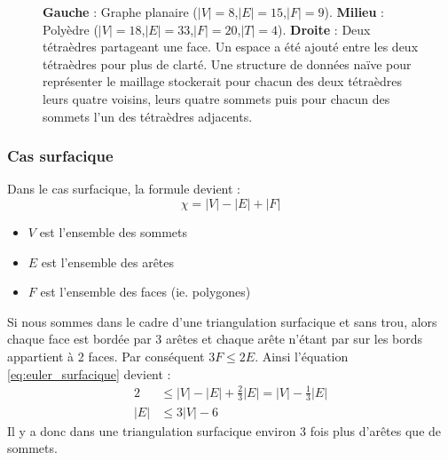 \begin{figure}[th]
\begin{subfigure}{.3\textwidth}
  \caption{}
  \label{fig:naive}
\end{subfigure}
\caption{\textbf{Gauche} : Graphe planaire ($|V|=8$,$|E|=15$,$|F|=9$). \textbf{Milieu} : Polyèdre ($|V|=18$,$|E|=33$,$|F|=20$,$|T|=4$). \textbf{Droite} : Deux tétraèdres partageant une face. Un espace a été ajouté entre les deux tétraèdres pour plus de clarté. Une structure de données naïve pour représenter le maillage stockerait pour chacun des deux tétraèdres leurs quatre voisins, leurs quatre sommets puis pour chacun des sommets l'un des tétraèdres adjacents.}
\label{fig:planar_graph_4cubes}
\end{figure}
\noindent

\subsubsection{Cas surfacique}
\label{combi_2d}
\noindent
Dans le cas surfacique, la formule devient :
\begin{equation}
\label{eq:euler_surfacique}
\chi = |V|-|E|+|F|
\end{equation}
\begin{itemize}
\item $V$ est l'ensemble des sommets
\item $E$ est l'ensemble des arêtes
\item $F$ est l'ensemble des faces (ie. polygones)\\
\end{itemize}
Si nous sommes dans le cadre d'une triangulation surfacique et sans trou, alors chaque face est bordée par 3 arêtes et chaque arête n'étant par sur les bords appartient à 2 faces. Par conséquent $3F\leqslant 2E$. Ainsi l'équation \ref{eq:euler_surfacique} devient :\\
\begin{align*}
2 &\leqslant |V| - |E| + \frac{2}{3}|E| = |V| - \frac{1}{3}|E|\\
|E|&\leqslant 3|V|-6
\end{align*}
Il y a donc dans une triangulation surfacique environ 3 fois plus d'arêtes que de sommets.
